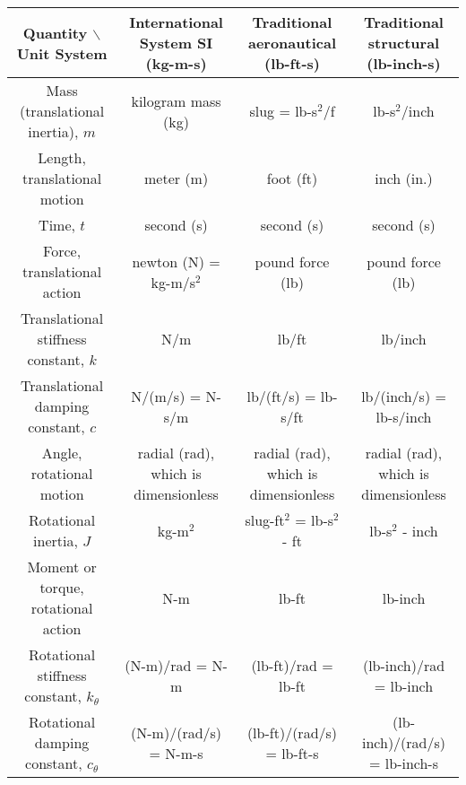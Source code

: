 \documentclass[border=20pt]{standalone}
\begin{document}
\begin{tabular}{|c|c|c|c|}
  \hline
  Quantity $\backslash$ Unit System & International System SI (kg-m-s) & Traditional aeronautical (lb-ft-s) & Traditional structural (lb-inch-s) \\
  \hline
  Mass (translational inertia), $m$ & kilogram mass (kg) & slug = lb-s$^2$/f & lb-s$^2$/inch \\
  \hline
  Length, translational motion & meter (m) & foot (ft) & inch (in.) \\
  \hline
  Time, $t$ & second (s) & second (s) & second (s) \\
  \hline
  Force, translational action & newton (N) = kg-m/s$^2$ & pound force (lb) & pound force (lb) \\
  \hline
  Translational stiffness constant, $k$ & N/m & lb/ft & lb/inch \\
  \hline
  Translational damping constant, $c$ & N/(m/s) = N-s/m & lb/(ft/s) = lb-s/ft & lb/(inch/s) = lb-s/inch \\
  \hline
  Angle, rotational motion & radial (rad), which is dimensionless & radial (rad), which is dimensionless & radial (rad), which is dimensionless \\
  \hline
  Rotational inertia, $J$ & kg-m$^2$ & slug-ft$^2$ = lb-s$^2$ - ft & lb-s$^2$ - inch \\
  \hline
  Moment or torque, rotational action & N-m & lb-ft & lb-inch \\
  \hline
  Rotational stiffness constant, $k_\theta$ & (N-m)/rad = N-m & (lb-ft)/rad = lb-ft & (lb-inch)/rad = lb-inch \\
  \hline
  Rotational damping constant, $c_\theta$ & (N-m)/(rad/s) = N-m-s & (lb-ft)/(rad/s) = lb-ft-s & (lb-inch)/(rad/s) = lb-inch-s \\
  \hline
\end{tabular}
\end{document}

